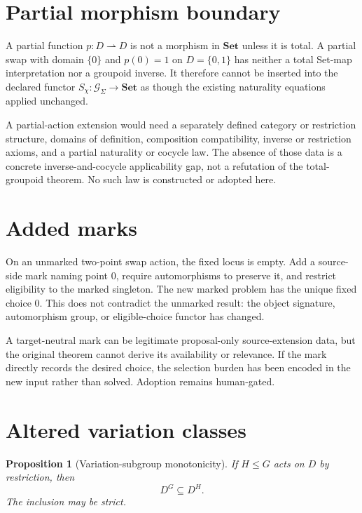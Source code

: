 \documentclass[11pt]{article}
\newtheorem{proposition}{Proposition}
\newcommand{\G}{\mathcal G_{\Sigma}}
\begin{document}
\section{Partial morphism boundary}

A partial function \(p:D\rightharpoonup D\) is not a morphism in
\(\mathbf{Set}\) unless it is total. A partial swap with domain \(\{0\}\)
and \(p(0)=1\) on \(D=\{0,1\}\) has neither a total Set-map interpretation
nor a groupoid inverse. It therefore cannot be inserted into the declared
functor \(S_\chi:\G\to\mathbf{Set}\) as though the existing naturality
equations applied unchanged.

A partial-action extension would need a separately defined category or
restriction structure, domains of definition, composition compatibility,
inverse or restriction axioms, and a partial naturality or cocycle law. The
absence of those data is a concrete inverse-and-cocycle applicability gap,
not a refutation of the total-groupoid theorem. No such law is constructed or
adopted here.

\section{Added marks}

On an unmarked two-point swap action, the fixed locus is empty. Add a
source-side mark naming point \(0\), require automorphisms to preserve it,
and restrict eligibility to the marked singleton. The new marked problem has
the unique fixed choice \(0\). This does not contradict the unmarked result:
the object signature, automorphism group, or eligible-choice functor has
changed.

A target-neutral mark can be legitimate proposal-only source-extension data,
but the original theorem cannot derive its availability or relevance. If the
mark directly records the desired choice, the selection burden has been
encoded in the new input rather than solved. Adoption remains human-gated.

\section{Altered variation classes}

\begin{proposition}[Variation-subgroup monotonicity]
If \(H\leq G\) acts on \(D\) by restriction, then
\[
  D^G\subseteq D^H.
\]
The inclusion may be strict.
\end{proposition}
\end{document}
